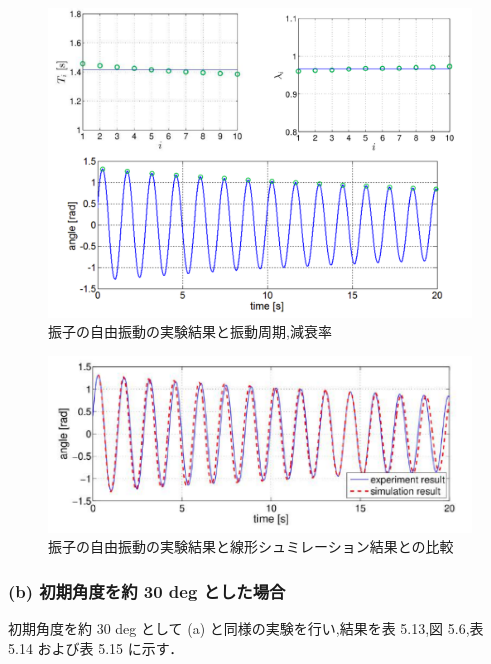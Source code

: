 \begin{figure}[h]
  \centering
  \includegraphics[scale=0.7]{sozai/6.pdf}
  \caption{振子の自由振動の実験結果と振動周期,減衰率}
\end{figure}

\begin{figure}[h]
  \centering
  \includegraphics[scale=0.7]{sozai/7.pdf}
  \caption{振子の自由振動の実験結果と線形シュミレーション結果との比較}
\end{figure}

\subsubsection*{(b) 初期角度を約 30 deg とした場合}

初期角度を約 30 deg として (a) と同様の実験を行い,結果を表 5.13,図 5.6,表 5.14 および表 5.15 
に示す．

